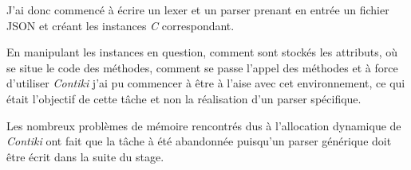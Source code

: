 J'ai donc commencé à écrire un lexer et un parser prenant en entrée un fichier JSON et créant les instances \emph{C} correspondant.

En manipulant les instances en question, comment sont stockés les attributs, où se situe le code des méthodes, comment se passe l'appel des méthodes et à force d'utiliser \emph{Contiki} j'ai pu commencer à être à l'aise avec cet environnement, ce qui était l'objectif de cette tâche et non la réalisation d'un parser spécifique.

Les nombreux problèmes de mémoire rencontrés dus à l'allocation dynamique de \emph{Contiki} ont fait que la tâche à été abandonnée puisqu'un parser générique doit être écrit dans la suite du stage.